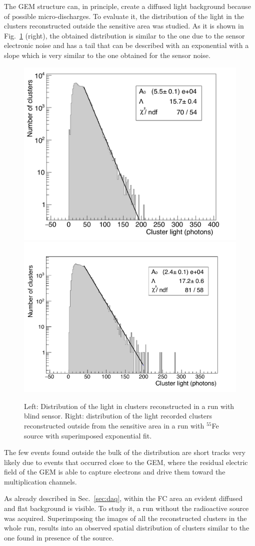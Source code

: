\documentclass[a4paper]{jpconf}
\begin{document}
The GEM structure can, in principle, create a diffused light
background because of possible micro-discharges.  To evaluate it, the
distribution of the light in the clusters reconstructed outside the
sensitive area was studied.  As it is shown in Fig.~\ref{fig:hq_ghost}
(right), the obtained distribution is similar to the one due to the
sensor electronic noise and has a tail that can be described with an
exponential with a slope which is very similar to the one obtained for
the sensor noise.
%
\begin{figure}[htbp]
\centering
\includegraphics[width=.40\textwidth]{hq_run818.pdf}
\includegraphics[width=.40\textwidth,height=.35\textwidth]{hqOut_run823.pdf}
\caption{Left: Distribution of the light in clusters reconstructed in
  a run with blind sensor.  Right: distribution of the light recorded
  clusters reconstructed outside from the sensitive area in a run with
  $^{55}$Fe source with superimposed exponential
  fit. \label{fig:hq_ghost}}
\end{figure}
%
The few events found outside the bulk of the distribution are short
tracks very likely due to events that occurred close to the GEM, where
the residual electric field of the GEM is able to capture electrons
and drive them toward the multiplication channels.

As already described in Sec.~\ref{sec:daq}, within the FC area an
evident diffused and flat background is visible.  To study it, a run
without the radioactive source was acquired. Superimposing the images
of all the reconstructed clusters in the whole run, results into an
observed spatial distribution of clusters similar to the one found in
presence of the source.
\end{document}
